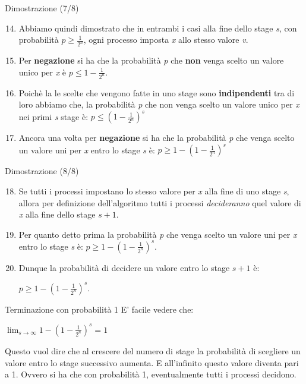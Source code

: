 \documentclass{beamer}
\begin{document}
\begin{frame}{Dimostrazione (7/8)}
    \begin{enumerate}
        \setcounter{enumi}{13}
        \item Abbiamo quindi dimostrato che in entrambi i casi alla fine dello stage \textit{s}, con probabilità $p \geq \frac{1}{2^n}$, ogni processo imposta \textit{x} allo stesso valore \textit{v}.
        \item Per \textbf{negazione} si ha che la probabilità \textit{p} che \textbf{non} venga scelto un valore unico per \textit{x} è $p \leq 1 - \frac{1}{2^n}$.
        \item Poichè la le scelte che vengono fatte in uno stage sono \textbf{indipendenti} tra di loro abbiamo che, la probabilità \textit{p} che non venga scelto un valore unico per \textit{x} nei primi \textit{s} stage è: $p \leq (1 - \frac{1}{2^n})^s$
        \item Ancora una volta per \textbf{negazione} si ha che la probabilità \textit{p} che venga scelto un valore uni per \textit{x} entro lo stage \textit{s} è: $p \geq 1 - (1 - \frac{1}{2^n})^s$ 
    \end{enumerate}
\end{frame}

\begin{frame}{Dimostrazione (8/8)}
    \begin{enumerate}
        \setcounter{enumi}{17}
        \item Se tutti i processi impostano lo stesso valore per \textit{x} alla fine di uno stage \textit{s}, allora per definizione dell'algoritmo tutti i processi \textit{decideranno} quel valore di \textit{x} alla fine dello stage $s + 1$.
        \item Per quanto detto prima la probabilità \textit{p} che venga scelto un valore uni per \textit{x} entro lo stage \textit{s} è: $p \geq 1 - (1 - \frac{1}{2^n})^s$. 
        \item Dunque la probabilità di decidere un valore entro lo stage $s + 1$ è:
        \begin{center}
            \Large
            $p \geq 1 - (1 - \frac{1}{2^n})^s$.
        \end{center}
    \end{enumerate}
\end{frame}

\begin{frame}{Terminazione con probabilità 1}
    E' facile vedere che:
    \begin{center}
        \Large
        $\lim_{s\to\infty} 1 - (1 - \frac{1}{2^n})^s = 1$
    \end{center}
    Questo vuol dire che al crescere del numero di stage la probabilità di scegliere un valore entro lo stage successivo aumenta. \newline \newline
    E all'infinito questo valore diventa pari a 1. Ovvero si ha che con probabilità 1, eventualmente tutti i processi decidono.
\end{frame}
\end{document}
